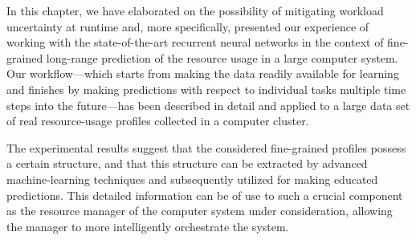 In this chapter, we have elaborated on the possibility of mitigating workload
uncertainty at runtime and, more specifically, presented our experience of
working with the state-of-the-art recurrent neural networks in the context of
fine-grained long-range prediction of the resource usage in a large computer
system. Our workflow---which starts from making the data readily available for
learning and finishes by making predictions with respect to individual tasks
multiple time steps into the future---has been described in detail and applied
to a large data set of real resource-usage profiles collected in a computer
cluster.

The experimental results suggest that the considered fine-grained profiles
possess a certain structure, and that this structure can be extracted by
advanced machine-learning techniques and subsequently utilized for making
educated predictions. This detailed information can be of use to such a crucial
component as the resource manager of the computer system under consideration,
allowing the manager to more intelligently orchestrate the system.
